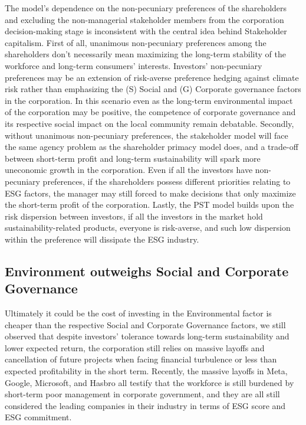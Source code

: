 \documentclass[a4paper, 12pt]{article}
\begin{document}
  The model's dependence on the non-pecuniary preferences of the shareholders and excluding the non-managerial stakeholder members from the corporation decision-making stage is inconsistent with the central idea behind Stakeholder capitalism. First of all, unanimous non-pecuniary preferences among the shareholders don't necessarily mean maximizing the long-term stability of the workforce and long-term consumers' interests. Investors' non-pecuniary preferences may be an extension of risk-averse preference hedging against climate risk rather than emphasizing the (S) Social and (G) Corporate governance factors in the corporation. In this scenario even as the long-term environmental impact of the corporation may be positive, the competence of corporate governance and its respective social impact on the local community remain debatable. Secondly, without unanimous non-pecuniary preferences, the stakeholder model will face the same agency problem as the shareholder primacy model does, and a trade-off between short-term profit and long-term sustainability will spark more uneconomic growth in the corporation. Even if all the investors have non-pecuniary preferences, if the shareholders possess different priorities relating to ESG factors, the manager may still forced to make decisions that only maximize the short-term profit of the corporation. Lastly, the PST model builds upon the risk dispersion between investors, if all the investors in the market hold sustainability-related products, everyone is risk-averse, and such low dispersion within the preference will dissipate the ESG industry.  


\subsection{Environment outweighs Social and Corporate Governance}
\vspace{-10pt}

  \hspace{12pt} Ultimately it could be the cost of investing in the Environmental factor is cheaper than the respective Social and Corporate Governance factors, we still observed that despite investors' tolerance towards long-term sustainability and lower expected return, the corporation still relies on massive layoffs and cancellation of future projects when facing financial turbulence or less than expected profitability in the short term. Recently, the massive layoffs in Meta, Google, Microsoft, and Hasbro all testify that the workforce is still burdened by short-term poor management in corporate government, and they are all still considered the leading companies in their industry in terms of ESG score and ESG commitment. 
  
\end{document}
